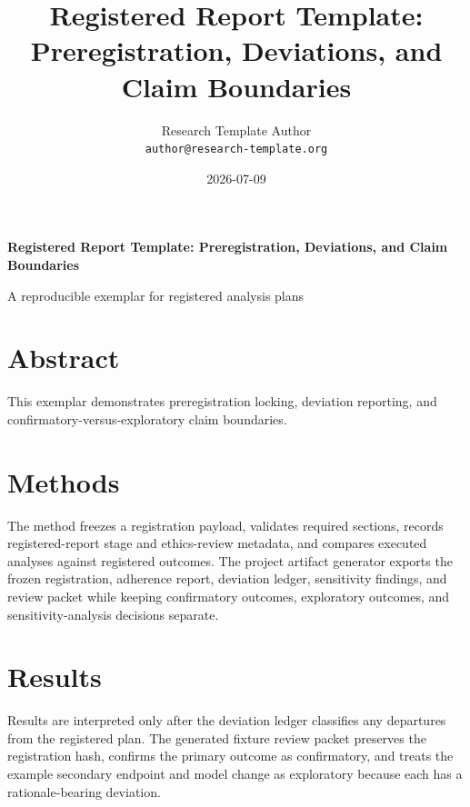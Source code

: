 \documentclass[
]{article}
\author{}
\date{}
\title{Registered Report Template: Preregistration, Deviations, and Claim Boundaries}
\author{Research Template Author\\\footnotesize{\texttt{author@research-template.org}}}
\date{2026-07-09}
\begin{document}
\begin{titlepage}
\centering
\vspace*{2cm}
{\LARGE\bfseries Registered Report Template: Preregistration, Deviations, and Claim Boundaries\par}
\vspace{0.75em}
{\large A reproducible exemplar for registered analysis plans\par}
\vfill
\makeatletter
{\@author\par}
\vspace{1em}
{\@date\par}
\makeatother
\vfill
\end{titlepage}
\thispagestyle{empty}
\tableofcontents
\newpage


\section{Abstract}\label{abstract}

This exemplar demonstrates preregistration locking, deviation reporting,
and confirmatory-versus-exploratory claim boundaries.

\newpage

\section{Methods}\label{methods}

The method freezes a registration payload, validates required sections,
records registered-report stage and ethics-review metadata, and compares
executed analyses against registered outcomes. The project artifact
generator exports the frozen registration, adherence report, deviation
ledger, sensitivity findings, and review packet while keeping
confirmatory outcomes, exploratory outcomes, and sensitivity-analysis
decisions separate.

\newpage

\section{Results}\label{results}

Results are interpreted only after the deviation ledger classifies any
departures from the registered plan. The generated fixture review packet
preserves the registration hash, confirms the primary outcome as
confirmatory, and treats the example secondary endpoint and model change
as exploratory because each has a rationale-bearing deviation.



\clearpage


\end{document}
